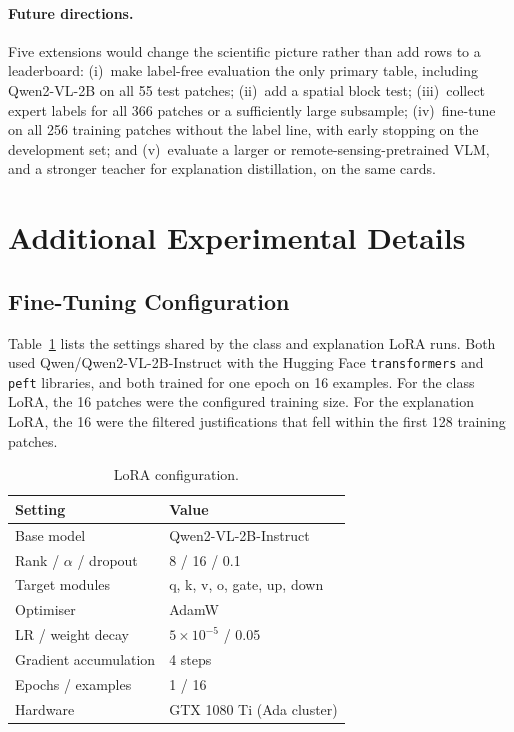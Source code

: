 \paragraph{Future directions.} Five extensions would change the scientific picture rather than add
rows to a leaderboard: (i)~make label-free evaluation the only primary
table, including Qwen2-VL-2B on all 55 test patches; (ii)~add a spatial
block test; (iii)~collect expert labels for all 366 patches or a
sufficiently large subsample; (iv)~fine-tune on all 256 training
patches without the label line, with early stopping on the development
set; and (v)~evaluate a larger or remote-sensing-pretrained VLM, and a
stronger teacher for explanation distillation, on the same cards.





\clearpage
\appendix

\section{Additional Experimental Details}

\subsection{Fine-Tuning Configuration}

Table~\ref{tab:ftconfig} lists the settings shared by the class and
explanation LoRA runs. Both used Qwen/Qwen2-VL-2B-Instruct with the
Hugging Face \texttt{transformers} and \texttt{peft} libraries, and both
trained for one epoch on 16 examples. For the class LoRA, the 16
patches were the configured training size. For the explanation LoRA,
the 16 were the filtered justifications that fell within the first 128
training patches.

\begin{table}[ht]
\centering
\small
\begin{tabular}{@{}ll@{}}
\toprule
Setting & Value \\
\midrule
Base model & Qwen2-VL-2B-Instruct \\
Rank / $\alpha$ / dropout & 8 / 16 / 0.1 \\
Target modules & q, k, v, o, gate, up, down \\
Optimiser & AdamW \\
LR / weight decay & $5\times10^{-5}$ / 0.05 \\
Gradient accumulation & 4 steps \\
Epochs / examples & 1 / 16 \\
Hardware & GTX 1080 Ti (Ada cluster) \\
\bottomrule
\end{tabular}
\caption{LoRA configuration.}
\label{tab:ftconfig}
\end{table}

